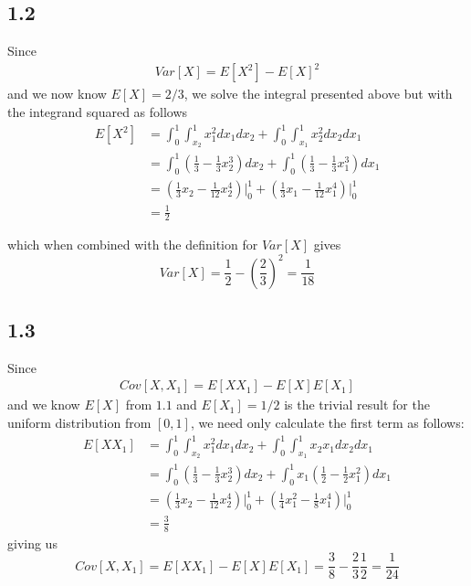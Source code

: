 \documentclass[12pt]{amsart}
\begin{document}
\subsection*{1.2}
Since
\begin{align}
Var[X] = E[X^2] - E[X]^2
\end{align}
and we now know $E[X] = 2/3$, we solve the integral presented above but with the integrand squared as follows
\begin{equation} \label{eqn:1.2}
\begin{split}
E[X^2] & = \int_0^1 \int_{x_2}^1 x_1^2 dx_1 dx_2 + \int_0^1 \int_{x_1}^1 x_2^2 dx_2 dx_1 \\
& = \int_0^1 (\frac{1}{3} - \frac{1}{3}x_2^3) dx_2 + \int_0^1 (\frac{1}{3} - \frac{1}{3}x_1^3) dx_1 \\
& = (\frac{1}{3}x_2 - \frac{1}{12}x_2^4)\vert_0^1 + (\frac{1}{3}x_1 - \frac{1}{12}x_1^4)\vert_0^1 \\
& = \frac{1}{2}
\end{split}
\end{equation}

which when combined with the definition for $Var[X]$ gives
\begin{equation}
Var[X] = \frac{1}{2} - \left( \frac{2}{3} \right)^2 = \frac{1}{18}
\end{equation}

\subsection*{1.3}

Since 
\begin{align}
Cov[X,X_1] = E[X X_1] - E[X]E[X_1]
\end{align}
and we know $E[X]$ from $1.1$ and $E[X_1] = 1/2$ is the trivial result for the uniform distribution from $[0,1]$, we need only calculate the first term as follows:
\begin{equation} \label{eqn:1.3}
\begin{split}
E[XX_1] & = \int_0^1 \int_{x_2}^1 x_1^2 dx_1 dx_2 + \int_0^1 \int_{x_1}^1 x_2 x_1 dx_2 dx_1 \\
& = \int_0^1 (\frac{1}{3} - \frac{1}{3}x_2^3) dx_2 + \int_0^1 x_1(\frac{1}{2} - \frac{1}{2}x_1^2) dx_1 \\
& = (\frac{1}{3}x_2 - \frac{1}{12}x_2^4) \vert_0^1 + (\frac{1}{4}x_1^2 - \frac{1}{8}x_1^4) \vert_0^1 \\
& = \frac{3}{8} 
\end{split}
\end{equation}
giving us
\begin{equation}
Cov[X,X_1] = E[X X_1] - E[X]E[X_1] = \frac{3}{8} - \frac{2}{3}\frac{1}{2} = \frac{1}{24}
\end{equation}
\end{document}
